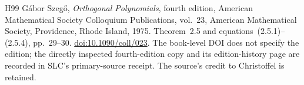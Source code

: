 \begin{thebibliography}{H99}
G\'abor Szeg\H{o}, \emph{Orthogonal Polynomials},
fourth edition, American Mathematical Society Colloquium Publications,
vol.~23, American Mathematical Society, Providence, Rhode Island, 1975.
Theorem~2.5 and equations~(2.5.1)--(2.5.4), pp.~29--30.
\href{https://doi.org/10.1090/coll/023}{doi:10.1090/coll/023}.
The book-level DOI does not specify the edition; the directly inspected
fourth-edition copy and its edition-history page are recorded in SLC's
primary-source receipt. The source's credit to Christoffel is retained.


\end{thebibliography}
